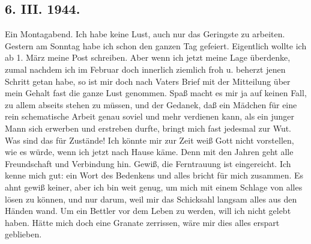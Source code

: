 \subsection{6. III. 1944.}

Ein Montagabend.
Ich habe keine Lust, auch nur das Geringste zu arbeiten.
Gestern am Sonntag habe ich schon den ganzen Tag gefeiert.
Eigentlich wollte ich ab  1. M\"{a}rz meine Post schreiben.
Aber wenn ich jetzt meine Lage \"{u}berdenke, zumal nachdem ich im Februar doch innerlich ziemlich froh u. beherzt jenen Schritt getan habe, so ist mir doch nach Vaters Brief mit der Mitteilung \"{u}ber mein Gehalt fast die ganze Lust genommen.
Spa{\ss} macht es mir ja auf keinen Fall, zu allem abseits stehen zu m\"{u}ssen, und der Gedanek, da{\ss} ein M\"{a}dchen f\"{u}r eine rein schematische Arbeit genau soviel und mehr verdienen kann, als ein junger Mann sich erwerben und erstreben durfte, bringt mich fast jedesmal zur Wut.
Was sind das f\"{u}r Zust\"{a}nde!
Ich k\"{o}nnte mir zur Zeit wei{\ss} Gott nicht vorstellen, wie es w\"{u}rde, wenn ich jetzt nach Hause k\"{a}me.
Denn mit den Jahren geht alle Freundschaft und Verbindung hin.
Gewi{\ss}, die Ferntrauung ist eingereicht.
Ich kenne mich gut: ein Wort des Bedenkens und alles bricht f\"{u}r mich zusammen.
Es ahnt gewi{\ss} keiner, aber ich bin weit genug, um mich mit einem Schlage von alles l\"{o}sen zu k\"{o}nnen, und nur darum, weil mir das Schicksahl langsam alles aus den H\"{a}nden wand.
Um ein Bettler vor dem Leben zu werden, will ich nicht gelebt haben.
H\"{a}tte mich doch eine Granate zerrissen, w\"{a}re mir dies alles erspart geblieben.

\clearpage
